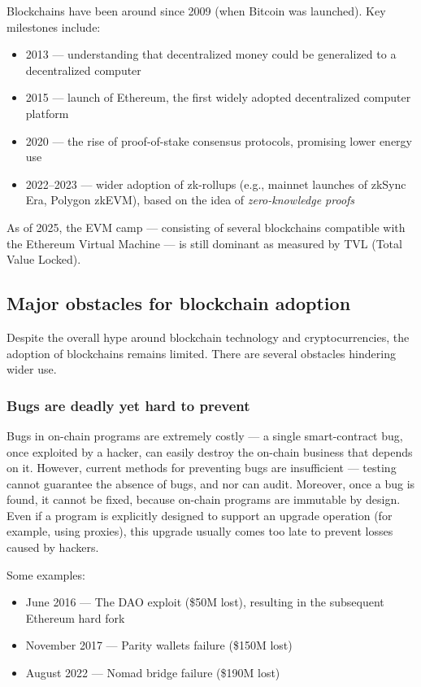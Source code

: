 \documentclass[a4paper]{article}
\begin{document}
Blockchains have been around since 2009 (when Bitcoin was launched). Key milestones include:

\begin{itemize}
  \item 2013 --- understanding that decentralized money could be generalized to a decentralized computer
  \item 2015 --- launch of Ethereum, the first widely adopted decentralized computer platform
  \item 2020 --- the rise of proof-of-stake consensus protocols, promising lower energy use
  \item 2022--2023 --- wider adoption of zk-rollups (e.g., mainnet launches of zkSync Era, Polygon zkEVM), based on the idea of \textit{zero-knowledge proofs}
\end{itemize}

As of 2025, the EVM camp --- consisting of several blockchains compatible with the Ethereum Virtual Machine --- is still dominant as measured by TVL (Total Value Locked).

\subsection{Major obstacles for blockchain adoption}

Despite the overall hype around blockchain technology and cryptocurrencies, the adoption of blockchains remains limited. There are several obstacles hindering wider use.

\subsubsection{Bugs are deadly yet hard to prevent}

Bugs in on-chain programs are extremely costly --- a single smart-contract bug, once exploited by a hacker, can easily destroy the on-chain business that depends on it. However, current methods for preventing bugs are insufficient --- testing cannot guarantee the absence of bugs, and nor can audit. Moreover, once a bug is found, it cannot be fixed, because on-chain programs are immutable by design. Even if a program is explicitly designed to support an upgrade operation (for example, using proxies), this upgrade usually comes too late to prevent losses caused by hackers.

Some examples:

\begin{itemize}
  \item June 2016 --- The DAO exploit (\$50M lost), resulting in the subsequent Ethereum hard fork
  \item November 2017 --- Parity wallets failure (\$150M lost)
  \item August 2022 --- Nomad bridge failure (\$190M lost)
\end{itemize}
\end{document}
